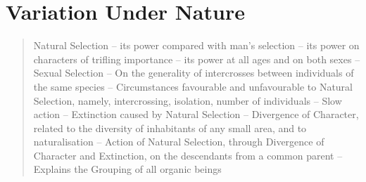 \chapter{Variation Under Nature}

\begin{quotation}
Natural Selection -- its power compared with man's selection -- its power on characters of trifling importance -- its power at all ages and on both sexes -- Sexual Selection -- On the generality of intercrosses between individuals of the same species -- Circumstances favourable and unfavourable to Natural Selection, namely, intercrossing, isolation, number of individuals -- Slow action -- Extinction caused by Natural Selection -- Divergence of Character, related to the diversity of inhabitants of any small area, and to naturalisation -- Action of Natural Selection, through Divergence of Character and Extinction, on the descendants from a common parent -- Explains the Grouping of all organic beings
\end{quotation}

